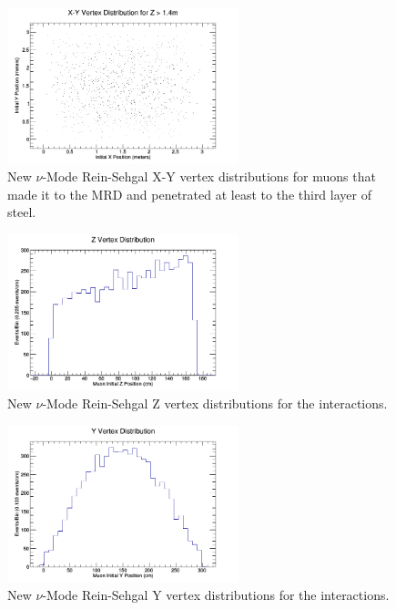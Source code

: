 \documentclass[11pt]{article}
\begin{document}
\begin{figure}[H]
\centering
\includegraphics[width=0.6\textwidth]{NewNMReinSehgalImages/1-X-YVertexDistributionNMRS.png}
\caption{New $\nu$-Mode Rein-Sehgal X-Y vertex distributions for muons that made it to the MRD and penetrated at least to the third layer of steel.}
\end{figure}

\begin{figure}[H]
\centering
\includegraphics[width=0.6\textwidth]{NewNMReinSehgalImages/2-ZVertexDistributionNMRS.png}
\caption{New $\nu$-Mode Rein-Sehgal Z vertex distributions for the interactions.}
\end{figure}

\begin{figure}[H]
\centering
\includegraphics[width=0.6\textwidth]{NewNMReinSehgalImages/3-YVertexDistributionNMRS.png}
\caption{New $\nu$-Mode Rein-Sehgal Y vertex distributions for the interactions.}
\end{figure}
\end{document}
